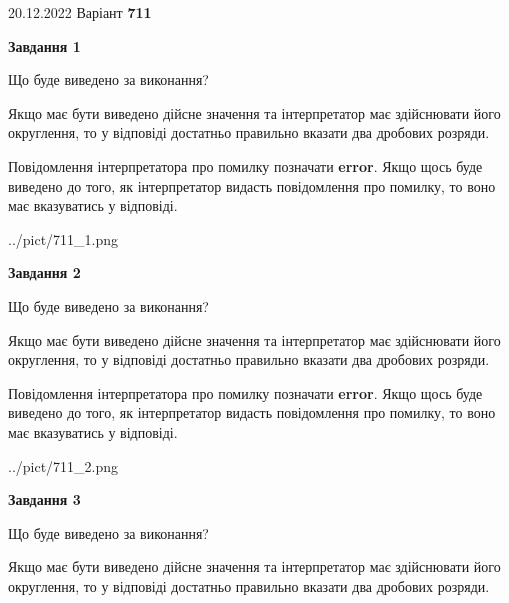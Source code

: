\documentclass[12pt, ukrainian]{article}
\begin{document}
{20.12.2022 Варіант \No \textbf { 711 }\par}
{
\begin {Large}

{\begin {center}\textbf{Завдання 1}\end {center}}\par
Що буде виведено за виконання? \par

Якщо має бути виведено дійсне значення та інтерпретатор має здійснювати його округлення, 
то у відповіді достатньо правильно вказати два дробових розряди.

Повідомлення інтерпретатора про помилку позначати \textbf{error}.
Якщо щось буде виведено до того, як інтерпретатор видасть повідомлення про помилку, 
то воно має вказуватись у відповіді. \par

\begin{center}
	{../pict/711_1.png}
\end{center}
\newpage

{\begin {center}\textbf{Завдання 2}\end {center}}\par
Що буде виведено за виконання? \par

Якщо має бути виведено дійсне значення та інтерпретатор має здійснювати його округлення, 
то у відповіді достатньо правильно вказати два дробових розряди.

Повідомлення інтерпретатора про помилку позначати \textbf{error}.
Якщо щось буде виведено до того, як інтерпретатор видасть повідомлення про помилку, 
то воно має вказуватись у відповіді. \par

\begin{center}
	{../pict/711_2.png}
\end{center}
\newpage

{\begin {center}\textbf{Завдання 3}\end {center}}\par
Що буде виведено за виконання? \par

Якщо має бути виведено дійсне значення та інтерпретатор має здійснювати його округлення, 
то у відповіді достатньо правильно вказати два дробових розряди.


\end{Large}}
\end{document}
